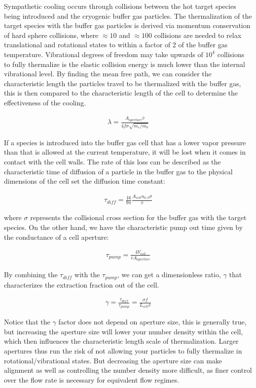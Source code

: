 Sympathetic cooling occurs through collisions between the hot target species being introduced and the cryogenic buffer gas particles. The thermalization of the target species with the buffer gas particles is derived via momentum conservation of hard sphere collisions, where $\approx 10$ and $\approx 100$ collisions are needed to relax translational and rotational states to within a factor of 2 of the buffer gas temperature. Vibrational degrees of freedom may take upwards of $10^4$ collisions to fully thermalize is the elastic collision energy is much lower than the internal vibrational level. By finding the mean free path, we can consider the characteristic length the particles travel to be thermalized with the buffer gas, this is then compared to the characteristic length of the cell to determine the effectiveness of the cooling.

\begin{align}
\lambda = \frac{A_{aperture} \bar{v}}{4 f \sigma \sqrt{m_s/m_b}}
\end{align}

If a species is introduced into the buffer gas cell that has a lower vapor pressure than that is allowed at the current temperature, it will be lost when it comes in contact with the cell walls. The rate of this loss can be described as the  characteristic time of diffusion of a particle in the buffer gas to the physical dimensions of the cell set the diffusion time constant:

\begin{align}
\tau_{diff} = \frac{16}{9 \pi} \frac{A_{cell} n_{0,b} \sigma}{\bar{v}}
\end{align}

where $\sigma$ represents the collisional cross section for the buffer gas with the target species. On the other hand, we have the characteristic pump out time given by the conductance of a cell aperture:

\begin{align}
\tau_{pump}=\frac{4V_{cell}}{\bar{v}A_{aperture}}
\end{align}

By combining the $\tau_{diff}$ with the $\tau_{pump}$, we can get a dimensionless ratio, $\gamma$ that characterizes the extraction fraction out of the cell.

\begin{align}
\gamma = \frac{\tau_{diff}}{\tau_{pump}} = \frac{\sigma f}{L_{cell} \bar{v}} \label{e: gamma}
\end{align}

Notice that the $\gamma$ factor does not depend on aperture size, this is generally true, but increasing the aperture size will lower your number density within the cell, which then influences the characteristic length scale of thermalization. Larger apertures thus run the risk of not allowing your particles to fully thermalize in rotational/vibrational states. But decreasing the aperture size can make alignment as well as controlling the number density more difficult, as finer control over the flow rate is necessary for equivalent flow regimes.